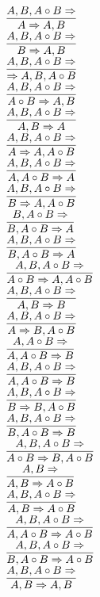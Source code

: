 \documentclass[11pt]{article}
\begin{document}
\begin{center}
\\$\infer{A\Rightarrow A, B}{A, B, A\circ B\Rightarrow }$
\bigskip
\\$\infer{B\Rightarrow A, B}{A, B, A\circ B\Rightarrow }$
\bigskip
\\$\infer{\Rightarrow A, B, A\circ B}{A, B, A\circ B\Rightarrow }$
\bigskip
\\$\infer{A\circ B\Rightarrow A, B}{A, B, A\circ B\Rightarrow }$
\bigskip
\\$\infer{A, B\Rightarrow A}{A, B, A\circ B\Rightarrow }$
\bigskip
\\$\infer{A\Rightarrow A, A\circ B}{A, B, A\circ B\Rightarrow }$
\bigskip
\\$\infer{A, A\circ B\Rightarrow A}{A, B, A\circ B\Rightarrow }$
\bigskip
\\$\infer{B\Rightarrow A, A\circ B}{A, B, A\circ B\Rightarrow }$
\bigskip
\\$\infer{B, A\circ B\Rightarrow A}{B, A\circ B\Rightarrow }$
\bigskip
\\$\infer{B, A\circ B\Rightarrow A}{A, B, A\circ B\Rightarrow }$
\bigskip
\\$\infer{A\circ B\Rightarrow A, A\circ B}{A, B, A\circ B\Rightarrow }$
\bigskip
\\$\infer{A, B\Rightarrow B}{A, B, A\circ B\Rightarrow }$
\bigskip
\\$\infer{A\Rightarrow B, A\circ B}{A, B, A\circ B\Rightarrow }$
\bigskip
\\$\infer{A, A\circ B\Rightarrow B}{A, A\circ B\Rightarrow }$
\bigskip
\\$\infer{A, A\circ B\Rightarrow B}{A, B, A\circ B\Rightarrow }$
\bigskip
\\$\infer{B\Rightarrow B, A\circ B}{A, B, A\circ B\Rightarrow }$
\bigskip
\\$\infer{B, A\circ B\Rightarrow B}{A, B, A\circ B\Rightarrow }$
\bigskip
\\$\infer{A\circ B\Rightarrow B, A\circ B}{A, B, A\circ B\Rightarrow }$
\bigskip
\\$\infer{A, B\Rightarrow A\circ B}{A, B\Rightarrow }$
\bigskip
\\$\infer{A, B\Rightarrow A\circ B}{A, B, A\circ B\Rightarrow }$
\bigskip
\\$\infer{A, A\circ B\Rightarrow A\circ B}{A, B, A\circ B\Rightarrow }$
\bigskip
\\$\infer{B, A\circ B\Rightarrow A\circ B}{A, B, A\circ B\Rightarrow }$
\bigskip
\\$\infer{A, B\Rightarrow A, B}{A, B, A\circ B\Rightarrow }$
\bigskip

\end{center}
\end{document}

